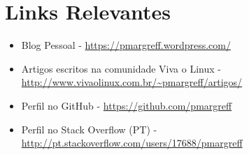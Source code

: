 \documentclass[11pt,a4paper,sans]{moderncv}        %
\begin{document}
\section{Links Relevantes}

\vspace{6pt}
 
\begin{itemize}

\item{Blog Pessoal - \href{https://pmargreff.wordpress.com/}{https://pmargreff.wordpress.com/}}

\item{Artigos escritos na comunidade Viva o Linux  - \href{http://www.vivaolinux.com.br/~pmargreff/artigos/}{http://www.vivaolinux.com.br/\~{}pmargreff/artigos/}}

\item{Perfil no GitHub - \href{https://github.com/pmargreff}{https://github.com/pmargreff}}

\item{Perfil no Stack Overflow (PT) - \href{http://pt.stackoverflow.com/users/17688/pmargreff}{http://pt.stackoverflow.com/users/17688/pmargreff}}

\end{itemize}


\nocite{*}



\end{document}
